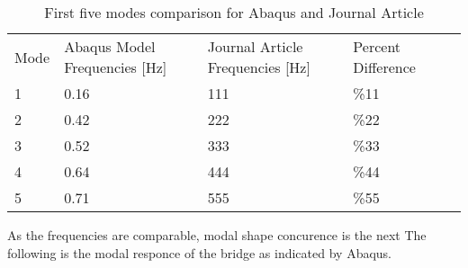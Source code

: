 \begin{table}
\begin{tabular}{lllll}
Mode & Abaqus Model Frequencies [Hz] & Journal Article Frequencies [Hz] & Percent Difference &  \\
1    & 0.16                          & 111                              & \%11               &  \\
2    & 0.42                          & 222                              & \%22               &  \\
3    & 0.52                          & 333                              & \%33               &  \\
4    & 0.64                          & 444                              & \%44               &  \\
5    & 0.71                          & 555                              & \%55               &  \\
\end{tabular}
\caption{First five modes comparison for Abaqus and Journal Article}
\label{tab:FirstFive}
\end{table}

As the frequencies are comparable, modal shape concurence is the next  
The following is the modal responce of the bridge as indicated by Abaqus. 
